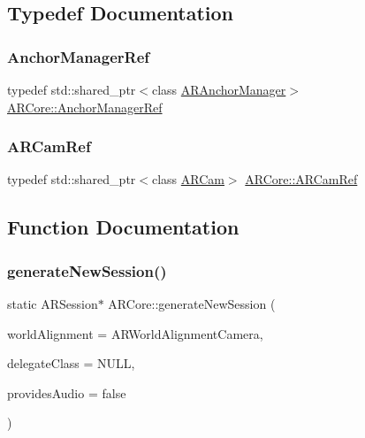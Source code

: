 \subsection{Typedef Documentation}
\mbox{\label{namespace_a_r_core_a3f2b9ba00b51ce19c1010f554a66a512}} 
\subsubsection{\texorpdfstring{Anchor\+Manager\+Ref}{AnchorManagerRef}}
{\footnotesize\ttfamily typedef std\+::shared\+\_\+ptr$<$class \hyperlink{class_a_r_core_1_1_a_r_anchor_manager}{A\+R\+Anchor\+Manager}$>$ \hyperlink{namespace_a_r_core_a3f2b9ba00b51ce19c1010f554a66a512}{A\+R\+Core\+::\+Anchor\+Manager\+Ref}}

\mbox{\label{namespace_a_r_core_a4ebe9e23907235fcf76bf65440fde0e0}} 
\subsubsection{\texorpdfstring{A\+R\+Cam\+Ref}{ARCamRef}}
{\footnotesize\ttfamily typedef std\+::shared\+\_\+ptr$<$class \hyperlink{class_a_r_core_1_1_a_r_cam}{A\+R\+Cam}$>$ \hyperlink{namespace_a_r_core_a4ebe9e23907235fcf76bf65440fde0e0}{A\+R\+Core\+::\+A\+R\+Cam\+Ref}}



\subsection{Function Documentation}
\mbox{\label{namespace_a_r_core_ab1e11f8de09a3f533f6ed38f93feb504}} 
\subsubsection{\texorpdfstring{generate\+New\+Session()}{generateNewSession()}}
{\footnotesize\ttfamily static A\+R\+Session$\ast$ A\+R\+Core\+::generate\+New\+Session (\begin{DoxyParamCaption}\item[{A\+R\+World\+Alignment}]{world\+Alignment = {\ttfamily ARWorldAlignmentCamera},  }\item[{N\+S\+Object$<$ A\+R\+Session\+Delegate $>$ $\ast$}]{delegate\+Class = {\ttfamily NULL},  }\item[{bool}]{provides\+Audio = {\ttfamily false} }\end{DoxyParamCaption})\hspace{0.3cm}{\ttfamily [static]}}

